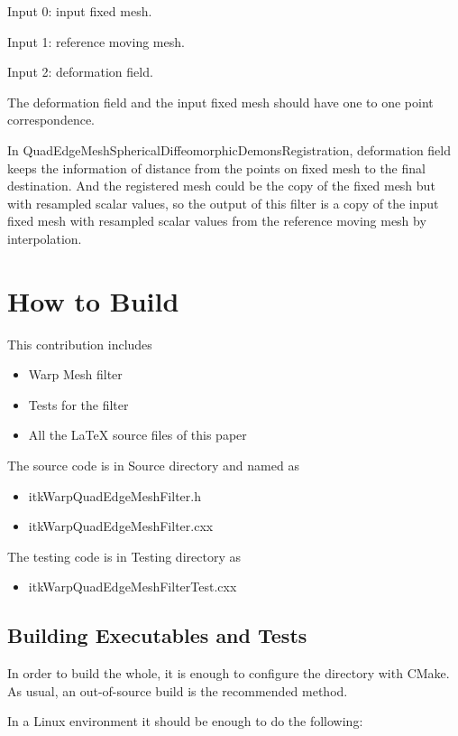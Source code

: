\documentclass{InsightArticle}
\begin{document}
Input 0: input fixed mesh.

Input 1: reference moving mesh.

Input 2: deformation field.

The deformation field and the input fixed mesh should have one to one point correspondence.

In QuadEdgeMeshSphericalDiffeomorphicDemonsRegistration, deformation field keeps the
information of distance from the points on fixed mesh to the final destination. And the registered
mesh could be the copy of the fixed mesh but with resampled scalar values, so the output of
this filter is a copy of the input fixed mesh with resampled scalar values from the reference moving
mesh by interpolation.

\section{How to Build}

This contribution includes

\begin{itemize}
\item Warp Mesh filter
\item Tests for the filter
\item All the LaTeX source files of this paper
\end{itemize}

The source code is in Source directory and named as 

\begin{itemize}
\item itkWarpQuadEdgeMeshFilter.h
\item itkWarpQuadEdgeMeshFilter.cxx
\end{itemize}


The testing code is in Testing directory as

\begin{itemize}
\item itkWarpQuadEdgeMeshFilterTest.cxx
\end{itemize}

\subsection{Building Executables and Tests}

In order to build the whole, it is enough to configure the directory with
CMake. As usual, an out-of-source build is the recommended method.

In a Linux environment it should be enough to do the following:
\end{document}
